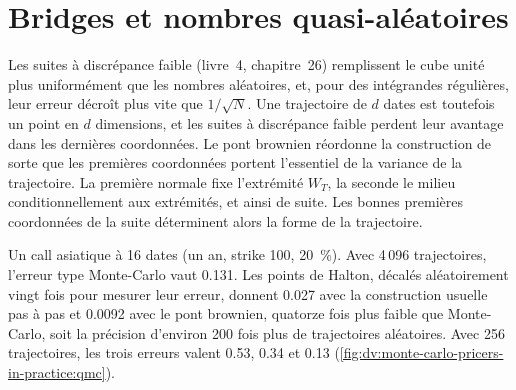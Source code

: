 \begin{omfigure}

\label{fig:dv:monte-carlo-pricers-in-practice:adjoint}
\end{omfigure}

\section{Bridges et nombres quasi-aléatoires}

Les suites à discrépance faible (livre~4, chapitre~26) remplissent le cube unité plus uniformément que les nombres aléatoires, et, pour des intégrandes régulières, leur erreur décroît plus vite
que $1/\sqrt N$. Une trajectoire de $d$ dates est toutefois un point en $d$ dimensions, et les suites à discrépance faible perdent leur avantage dans les dernières
coordonnées. Le pont brownien réordonne la construction de sorte que les premières coordonnées portent l'essentiel de la variance de la trajectoire. La première normale fixe
l'extrémité $W_T$, la seconde le milieu conditionnellement aux extrémités, et ainsi de suite. Les bonnes premières coordonnées de la suite déterminent alors la forme de la trajectoire.

\begin{example}\label{ex:dv:monte-carlo-pricers-in-practice:qmc}
Un call asiatique à 16 dates (un an, strike 100, 20~\%). Avec 4\,096 trajectoires, l'erreur type Monte-Carlo vaut 0.131. Les points de Halton, décalés aléatoirement vingt fois
pour mesurer leur erreur, donnent 0.027 avec la construction usuelle pas à pas et 0.0092 avec le pont brownien, quatorze fois plus faible que Monte-Carlo,
soit la précision d'environ 200 fois plus de trajectoires aléatoires. Avec 256 trajectoires, les trois erreurs valent 0.53, 0.34 et 0.13
(\cref{fig:dv:monte-carlo-pricers-in-practice:qmc}).
\end{example}

